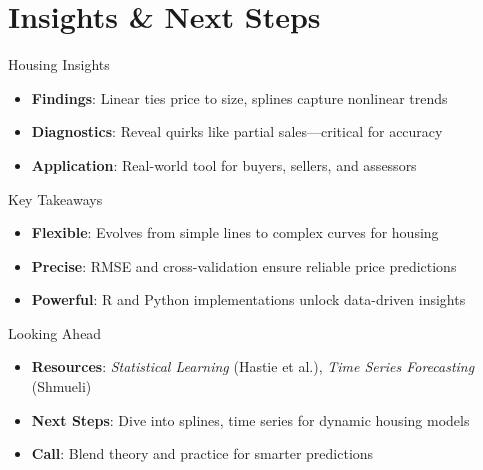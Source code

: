 \documentclass{beamer}
\begin{document}
	\section{Insights \& Next Steps}
	
	\begin{frame}{Housing Insights}
		\begin{itemize}
			\item \textbf{Findings}: Linear ties price to size, splines capture nonlinear trends
			\item \textbf{Diagnostics}: Reveal quirks like partial sales—critical for accuracy
			\item \textbf{Application}: Real-world tool for buyers, sellers, and assessors
		\end{itemize}
	\end{frame}
	
	\begin{frame}{Key Takeaways}
		\begin{itemize}
			\item \textbf{Flexible}: Evolves from simple lines to complex curves for housing
			\item \textbf{Precise}: RMSE and cross-validation ensure reliable price predictions
			\item \textbf{Powerful}: R and Python implementations unlock data-driven insights
		\end{itemize}
	\end{frame}
	
	\begin{frame}{Looking Ahead}
		\begin{itemize}
			\item \textbf{Resources}: \textit{Statistical Learning} (Hastie et al.), \textit{Time Series Forecasting} (Shmueli)
			\item \textbf{Next Steps}: Dive into splines, time series for dynamic housing models
			\item \textbf{Call}: Blend theory and practice for smarter predictions
		\end{itemize}
	\end{frame}
	
\end{document}
